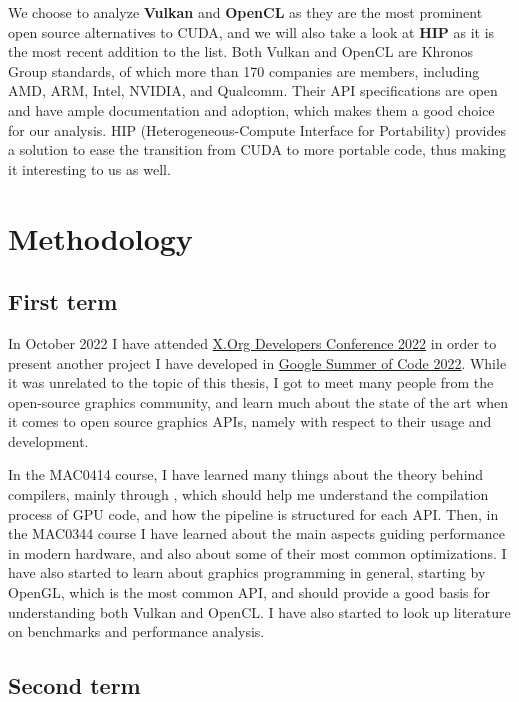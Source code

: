 \documentclass[conference, onecolumn]{IEEEtran}
\begin{document}
We choose to analyze \textbf{Vulkan} and \textbf{OpenCL} as they are the most
prominent open source alternatives to CUDA, and we will also take a look at
\textbf{HIP} as it is the most recent addition to the list.
Both Vulkan and OpenCL are Khronos Group standards, of which more than 170
companies are members, including AMD, ARM, Intel, NVIDIA, and Qualcomm.
Their API specifications are open and have ample documentation and adoption,
which makes them a good choice for our analysis.
HIP (Heterogeneous-Compute Interface for Portability) provides a solution to
ease the transition from CUDA to more portable code, thus making it interesting
to us as well.

\section{Methodology} \label{sec:methodology}

\subsection{First term} \label{sec:methodology:1st-term}

In October 2022 I have attended
\href{https://indico.freedesktop.org/event/2/page/11-overview}{X.Org Developers Conference 2022}
in order to present another project I have developed in
\href{https://summerofcode.withgoogle.com/programs/2022/projects/6AoBcunH}{Google Summer of Code 2022}.
While it was unrelated to the topic of this thesis, I got to meet many people
from the open-source graphics community, and learn much about the state of the
art when it comes to open source graphics APIs, namely with respect to their
usage and development.

In the MAC0414 course, I have learned many things about the theory behind
compilers, mainly through \cite{sipser1996introduction}, which should help me
understand the compilation process of GPU code, and how the pipeline is
structured for each API.
Then, in the MAC0344 course I have learned about the main aspects guiding
performance in modern hardware, and also about some of their most common
optimizations.
I have also started to learn about graphics programming in general, starting by
OpenGL, which is the most common API, and should provide a good basis for
understanding both Vulkan and OpenCL.
I have also started to look up literature on benchmarks and performance
analysis.

\subsection{Second term} \label{sec:methodology:2nd-term}
\end{document}
